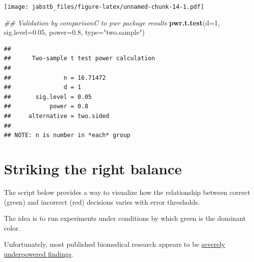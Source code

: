 \documentclass[]{book}
\newenvironment{Shaded}{\begin{snugshade}}{\end{snugshade}}
\newcommand{\CommentTok}[1]{\textcolor[rgb]{0.56,0.35,0.01}{\textit{#1}}}
\newcommand{\DataTypeTok}[1]{\textcolor[rgb]{0.13,0.29,0.53}{#1}}
\newcommand{\DecValTok}[1]{\textcolor[rgb]{0.00,0.00,0.81}{#1}}
\newcommand{\FloatTok}[1]{\textcolor[rgb]{0.00,0.00,0.81}{#1}}
\newcommand{\KeywordTok}[1]{\textcolor[rgb]{0.13,0.29,0.53}{\textbf{#1}}}
\newcommand{\NormalTok}[1]{#1}
\newcommand{\StringTok}[1]{\textcolor[rgb]{0.31,0.60,0.02}{#1}}
\begin{document}
\texttt{[image: jabstb\_files/figure-latex/unnamed-chunk-14-1.pdf]}

\begin{Shaded}
\begin{Highlighting}[]
\CommentTok{## Validation by comparisonC to pwr package results}
\KeywordTok{pwr.t.test}\NormalTok{(}\DataTypeTok{d=}\DecValTok{1}\NormalTok{, }
           \DataTypeTok{sig.level=}\FloatTok{0.05}\NormalTok{, }
           \DataTypeTok{power=}\FloatTok{0.8}\NormalTok{, }
           \DataTypeTok{type=}\StringTok{"two.sample"}\NormalTok{)}
\end{Highlighting}
\end{Shaded}

\begin{verbatim}
## 
##      Two-sample t test power calculation 
## 
##               n = 16.71472
##               d = 1
##       sig.level = 0.05
##           power = 0.8
##     alternative = two.sided
## 
## NOTE: n is number in *each* group
\end{verbatim}

\hypertarget{striking-the-right-balance}{%
\section{Striking the right balance}\label{striking-the-right-balance}}

The script below provides a way to visualize how the relationship between correct (green) and incorrect (red) decisions varies with error thresholds.

The idea is to run experiments under conditions by which green is the dominant color.

Unfortunately, most published biomedical research appears to be \href{https://www.ncbi.nlm.nih.gov/pmc/articles/PMC5367316/}{severely underpowered findings}.
\end{document}
